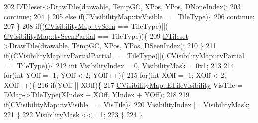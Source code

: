 \begin{DoxyCode}
202                 \hyperlink{classCFogRenderer_af9f3956c6e371f112ee1ce5decd7ae89}{DTileset}->DrawTile(drawable, TempGC, XPos, YPos, 
      \hyperlink{classCFogRenderer_ac4731c0fcb7e73be9fd6839659e519ba}{DNoneIndex});
203                 \textcolor{keywordflow}{continue};
204             \}
205             \textcolor{keywordflow}{else} \textcolor{keywordflow}{if}(\hyperlink{classCVisibilityMap_a6665f905da08825adbb0eee7bd1f2f30a3c881652ef7164aa086e595eef0ff5d6}{CVisibilityMap::tvVisible} == TileType)\{
206                 \textcolor{keywordflow}{continue};
207             \}
208             \textcolor{keywordflow}{if}((\hyperlink{classCVisibilityMap_a6665f905da08825adbb0eee7bd1f2f30ab7c30a117286ac3a8891862f6c1bb5c6}{CVisibilityMap::tvSeen} == TileType)||(
      \hyperlink{classCVisibilityMap_a6665f905da08825adbb0eee7bd1f2f30a7f9292f5d7ed9e9497f8ef342c890466}{CVisibilityMap::tvSeenPartial} == TileType))\{
209                 \hyperlink{classCFogRenderer_af9f3956c6e371f112ee1ce5decd7ae89}{DTileset}->DrawTile(drawable, TempGC, XPos, YPos, 
      \hyperlink{classCFogRenderer_acac9ab2c0a8023661ab1aa096d713458}{DSeenIndex});
210             \}
211             \textcolor{keywordflow}{if}((\hyperlink{classCVisibilityMap_a6665f905da08825adbb0eee7bd1f2f30a75af969b6d667b802b64bacd8bca7b63}{CVisibilityMap::tvPartialPartial} == TileType)||(
      \hyperlink{classCVisibilityMap_a6665f905da08825adbb0eee7bd1f2f30a0037f47075e3bde5e8e32dbd55754976}{CVisibilityMap::tvPartial} == TileType))\{
212                 \textcolor{keywordtype}{int} VisibilityIndex = 0, VisibilityMask = 0x1;
213                 
214                 \textcolor{keywordflow}{for}(\textcolor{keywordtype}{int} YOff = -1; YOff < 2; YOff++)\{
215                     \textcolor{keywordflow}{for}(\textcolor{keywordtype}{int} XOff = -1; XOff < 2; XOff++)\{
216                         \textcolor{keywordflow}{if}(YOff || XOff)\{
217                             \hyperlink{classCVisibilityMap_a6665f905da08825adbb0eee7bd1f2f30}{CVisibilityMap::ETileVisibility} VisTile = 
      \hyperlink{classCFogRenderer_a06be3616da23b5fce8ab3407b81788a4}{DMap}->TileType(XIndex + XOff, YIndex + YOff);
218                             
219                             \textcolor{keywordflow}{if}(\hyperlink{classCVisibilityMap_a6665f905da08825adbb0eee7bd1f2f30a3c881652ef7164aa086e595eef0ff5d6}{CVisibilityMap::tvVisible} == VisTile)\{
220                                 VisibilityIndex |= VisibilityMask;   
221                             \}
222                             VisibilityMask <<= 1;
223                         \}
224                     \}

\end{DoxyCode}
